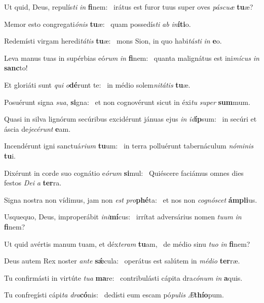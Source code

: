 \item Ut quid, Deus, repulís\textit{ti} \textit{in} \textbf{fi}nem:~\psstar{} irátus est furor tuus super oves \textit{páscuæ} \textbf{tu}æ?
\item Memor esto congregati\textit{ónis} \textbf{tu}æ:~\psstar{} quam possedís\textit{ti} \textit{ab} \textit{in}\textbf{í}\textbf{ti}o.
\item Redemísti virgam heredi\textit{tátis} \textbf{tu}æ:~\psstar{} mons Sion, in quo habi\textit{tásti} \textit{in} \textbf{e}o.
\item Leva manus tuas in supérbias eó\textit{rum} \textit{in} \textbf{fi}nem:~\psstar{} quanta malignátus est ini\textit{mícus} \textit{in} \textbf{sanc}to!
\item Et gloriáti sunt \textit{qui} \textit{o}\textbf{dé}runt te:~\psstar{} in médio solem\textit{nitátis} \textbf{tu}æ.
\item Posuérunt signa \textit{sua}, \textbf{si}gna:~\psstar{} et non cognovérunt sicut in éxi\textit{tu} \textit{super} \textbf{sum}mum.
\item Quasi in silva lignórum secúribus excidérunt jánuas ejus \textit{in} \textit{id}\textbf{íp}sum:~\psstar{} in secúri et áscia de\textit{jecérunt} \textbf{e}am.
\item Incendérunt igni sanctuá\textit{rium} \textbf{tu}um:~\psstar{} in terra polluérunt tabernáculum \textit{nóminis} \textbf{tu}i.
\item Dixérunt in corde suo cognátio e\textit{órum} \textbf{si}mul:~\psstar{} Quiéscere faciámus omnes dies festos \textit{Dei} \textit{a} \textbf{ter}ra.
\item Signa nostra non vídimus, jam non \textit{est} \textit{pro}\textbf{phé}ta:~\psstar{} et nos non \textit{cognóscet} \textbf{ám}\textbf{pli}us.
\item Usquequo, Deus, improperábit \textit{ini}\textbf{mí}cus:~\psstar{} irrítat adversárius nomen \textit{tuum} \textit{in} \textbf{fi}nem?
\item Ut quid avértis manum tuam, et déx\textit{teram} \textbf{tu}am,~\psstar{} de médio sinu \textit{tuo} \textit{in} \textbf{fi}nem?
\item Deus autem Rex noster \textit{ante} \textbf{sǽ}cula:~\psstar{} operátus est salútem in \textit{médio} \textbf{ter}ræ.
\item Tu confirmásti in virtúte \textit{tua} \textbf{ma}re:~\psstar{} contribulásti cápita dra\textit{cónum} \textit{in} \textbf{a}quis.
\item Tu confregísti cápi\textit{ta} \textit{dra}\textbf{có}nis:~\psstar{} dedísti eum escam pó\textit{pulis} \textit{Æ}\textbf{thí}\textbf{o}pum.
